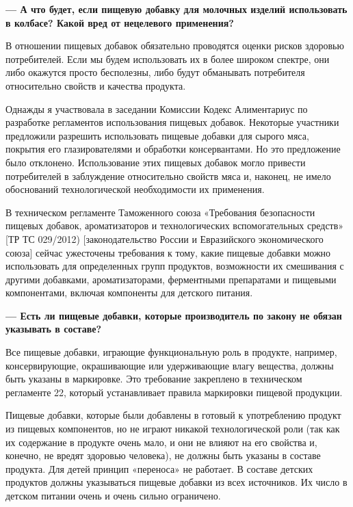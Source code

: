 \textbf{--- А что будет, если пищевую добавку для молочных изделий
    использовать в колбасе? Какой вред от нецелевого применения? }

В отношении пищевых добавок обязательно проводятся оценки рисков здоровью потребителей.
Если мы будем использовать их в более широком спектре, они либо окажутся просто бесполезны,
либо будут обманывать потребителя относительно свойств и качества продукта.

Однажды я участвовала в заседании Комиссии Кодекс Алиментариус
по разработке регламентов использования пищевых добавок.
Некоторые участники предложили разрешить использовать пищевые добавки для
 сырого мяса,
покрытия его глазирователями и обработки консервантами.
Но это предложение было отклонено.
Использование этих пищевых добавок могло привести потребителей
в заблуждение относительно свойств мяса и, наконец,
не имело обоснований технологической необходимости их применения.

В техническом регламенте Таможенного союза «Требования безопасности
пищевых добавок, ароматизаторов и технологических вспомогательных средств»
[ТР ТС 029/2012) [законодательство России и Евразийского экономического союза]
сейчас ужесточены требования к тому, какие пищевые добавки можно
использовать для определенных групп продуктов, возможности их смешивания
с другими добавками, ароматизаторами, ферментными препаратами и
пищевыми компонентами, включая компоненты для детского питания.

\textbf{--- Есть ли пищевые добавки, которые производитель по закону не обязан указывать в составе?}

\begin{fancyquotes}
    Все пищевые добавки, играющие функциональную роль в продукте, например,
    консервирующие, окрашивающие или удерживающие влагу вещества,
    должны быть указаны в маркировке.
    Это требование закреплено в техническом регламенте 22,
    который устанавливает правила маркировки пищевой продукции.
\end{fancyquotes}

Пищевые добавки, которые были добавлены в готовый к употреблению продукт
из пищевых компонентов, но не играют никакой технологической роли
(так как их содержание в продукте очень мало, и они не влияют на его
свойства и, конечно, не вредят здоровью человека), не должны быть указаны
в составе продукта.
Для детей принцип «переноса» не работает.
В составе детских продуктов должны указываться пищевые добавки
из всех источников. Их число в детском питании очень и очень сильно ограничено.

